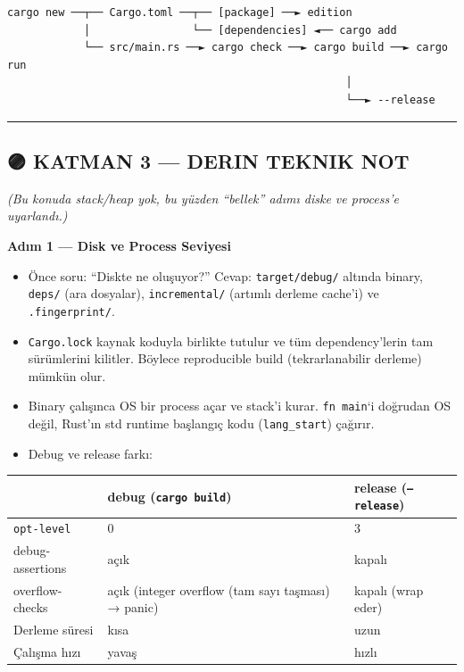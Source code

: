 \documentclass[12pt,a4paper]{article}
\begin{document}
\begin{verbatim}
cargo new ──┬── Cargo.toml ──┬── [package] ──► edition
            │                └── [dependencies] ◄── cargo add
            └── src/main.rs ──► cargo check ──► cargo build ──► cargo run
                                                     │
                                                     └──► --release
\end{verbatim}

\begin{center}\rule{0.5\linewidth}{0.5pt}\end{center}

\subsection{🟣 KATMAN 3 --- DERIN TEKNIK NOT}\label{katman-3-—-derin-teknik-not}

\emph{(Bu konuda stack/heap yok, bu yüzden ``bellek'' adımı diske ve process'e uyarlandı.)}

\textbf{Adım 1 --- Disk ve Process Seviyesi}

\begin{itemize}
\tightlist
\item
  Önce soru: ``Diskte ne oluşuyor?'' Cevap: \texttt{target/debug/} altında binary, \texttt{deps/} (ara dosyalar), \texttt{incremental/} (artımlı derleme cache'i) ve \texttt{.fingerprint/}.
\item
  \texttt{Cargo.lock} kaynak koduyla birlikte tutulur ve tüm dependency'lerin tam sürümlerini kilitler. Böylece reproducible build (tekrarlanabilir derleme) mümkün olur.
\item
  Binary çalışınca OS bir process açar ve stack'i kurar. \texttt{fn\ main}`i doğrudan OS değil, Rust'ın std runtime başlangıç kodu (\texttt{lang\_start}) çağırır.
\item
  Debug ve release farkı:
\end{itemize}

{\def\LTcaptype{none} %
\begin{longtable}[]{@{}lll@{}}
\toprule\noalign{}
& debug (\texttt{cargo\ build}) & release (\texttt{--release}) \\
\midrule\noalign{}
\endhead
\bottomrule\noalign{}
\endlastfoot
\texttt{opt-level} & 0 & 3 \\
debug-assertions & açık & kapalı \\
overflow-checks & açık (integer overflow (tam sayı taşması) → panic) & kapalı (wrap eder) \\
Derleme süresi & kısa & uzun \\
Çalışma hızı & yavaş & hızlı \\
\end{longtable}
}
\end{document}
